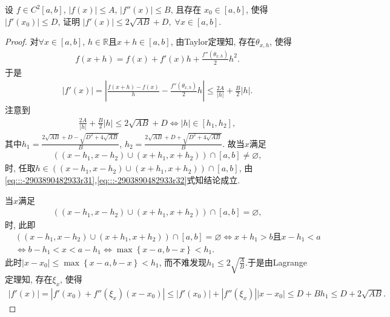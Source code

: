 \documentclass[../../main.tex]{subfiles}%
\begin{document}
\begin{example}
设 $f \in C^2[a,b]$, $|f(x)| \leqslant A$, $|f''(x)| \leqslant B$, 且存在 $x_0 \in [a,b]$, 使得 $|f'(x_0)| \leqslant D$, 证明
$|f'(x)| \leqslant 2\sqrt{AB} + D,\; \forall x \in [a,b]$.
\end{example}
\begin{proof}
对$\forall x\in \left[ a,b \right]$, $h\in \mathbb{R}$且$x+h\in \left[ a,b \right]$, 由Taylor定理知, 存在$\theta _{x,h}$, 使得
\begin{align}
f\left( x+h \right) =f\left( x \right) +f'(x) h+\frac{f'' \left( \theta _{x,h} \right)}{2}h^2. \label{eq:::-2903890482933r31}
\end{align}
于是
\begin{align*}
\left| f'(x) \right|=\left| \frac{f\left( x+h \right) -f\left( x \right)}{h}-\frac{f'' \left( \theta _{x,h} \right)}{2}h \right|\leqslant \frac{2A}{\left| h \right|}+\frac{B}{2}\left| h \right|.
\end{align*}
注意到
\begin{align}
\frac{2A}{\left| h \right|}+\frac{B}{2}\left| h \right|\leqslant 2\sqrt{AB}+D \Longleftrightarrow \left| h \right|\in \left[ h_1,h_2 \right], \label{eq:::-2903890482933r32}
\end{align}
其中$h_1=\frac{2\sqrt{AB}+D-\sqrt{D^2+4\sqrt{AB}}}{B}$, $h_2=\frac{2\sqrt{AB}+D+\sqrt{D^2+4\sqrt{AB}}}{B}.$
故当$x$满足
\begin{align*}
\left( \left( x-h_1,x-h_2 \right) \cup \left( x+h_1,x+h_2 \right) \right) \cap \left[ a,b \right] \ne \varnothing,
\end{align*}
时, 任取$h\in \left( \left( x-h_1,x-h_2 \right) \cup \left( x+h_1,x+h_2 \right) \right) \cap \left[ a,b \right]$, 由\eqref{eq:::-2903890482933r31},\eqref{eq:::-2903890482933r32}式知结论成立.

当$x$满足
\begin{align*}
\left( \left( x-h_1,x-h_2 \right) \cup \left( x+h_1,x+h_2 \right) \right) \cap \left[ a,b \right] = \varnothing,
\end{align*}
时, 此即
\begin{align*}
&\left( \left( x-h_1,x-h_2 \right) \cup \left( x+h_1,x+h_2 \right) \right) \cap \left[ a,b \right] = \varnothing \Longleftrightarrow x+h_1>b \text{且} x-h_1<a \\
&\Longleftrightarrow b-h_1<x<a-h_1 \Longleftrightarrow \max\left\{ x-a,b-x \right\} <h_1.
\end{align*}
此时$\left| x-x_0 \right|\leqslant \max\left\{ x-a,b-x \right\} <h_1$, 而不难发现$h_1\leqslant 2\sqrt{\frac{A}{B}}.$于是由Lagrange定理知, 存在$\xi _x$, 使得
\begin{align*}
\left| f'(x) \right|=\left| f'(x_0) +f'' \left( \xi _x \right) \left( x-x_0 \right) \right|\leqslant \left| f'(x_0) \right|+\left| f'' \left( \xi _x \right) \right|\left| x-x_0 \right|\leqslant D+Bh_1\leqslant D+2\sqrt{AB}.
\end{align*}
\end{proof}
\end{document}
